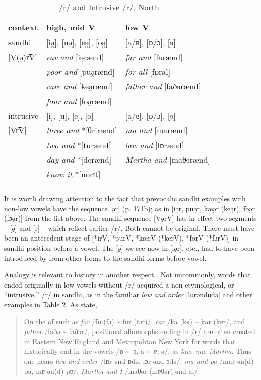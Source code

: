\documentclass[output=paper,
modfonts
]{LSP/langsci}
\begin{document}
\begin{table}[ht]
\centering\caption{ /r/ and Intrusive /r/, North}
\begin{tabular}{lll}
\lsptoprule
context 		  & 		high, mid V 		& low V\\
\midrule
sandhi 	  	  &  {[}iə̯{]}, {[}uə̯{]}, {[}eə̯{]}, {[}oə̯{]}	&	[a/ɐ], [ɒ/ɔ], [ɘ]\\
{[}V(ə̯)r͡V{]} & \emph{ear and} {[}iə̯rænd{]}		&	\emph{far and} {[}farænd{]}\\
			  & \emph{poor and} {[}puə̯rænd{]}		&	\emph{for all} {[}fɒral{]} \\
			  & \emph{care and} {[}keə̯rænd{]}		&	\emph{father and} {[}faðɘrænd{]}\\
			  & \emph{four and} {[}foə̯rænd{]}	 	& 	\\
intrusive		  & {[}i{]}, {[}u{]}, {[}e{]}, {[}o{]}			&	[a/ɐ], [ɒ/ɔ], [ɘ] \\
{[}Vr͡V{]}	  & \emph{three and} *{[}θrirænd{]}		&	\emph{ma and} {[}marænd{]} \\
			  & \emph{two and} *{[}turænd{]}		&	\emph{law and} [lɒr\underline{ænd}] \\
			  & \emph{day and} *{[}derænd{]}		&	\emph{Martha and} {[}maθɘrænd{]} \\
			  & \emph{know it} *{[}norɪt{]}			&	\\
\lspbottomrule
\end{tabular}
\end{table}

\largerpage
It is worth drawing attention to the fact that prevocalic sandhi
examples with non-low vowels have the sequence {[}ə̯r{]} (p. 171b); as in
{[}iə̯r, puə̯r, kæə̯r (keə̯r), foə̯r (fɔə̯r){]} from the list above. The
sandhi sequence {[}Və̯rV{]} has in effect two segments -- {[}ə̯{]} and
{[}r{]} -- which reflect earlier /r/. Both cannot be original. There must
have been an antecedent stage of {[}*irV, *purV, *kærV (*kerV), *forV
(*fɔrV){]} in sandhi position before a vowel. The {[}ə̯{]} we see now in
{[}iə̯r{]}, etc., had to have been introduced by  from other forms
to the sandhi forms before vowel.

  
Analogy is relevant to history in another respect \citep{SOS}. Not
uncommonly, words that ended originally in low vowels without /r/
acquired a non-etymological, or ``intrusive,'' /r/ in sandhi, as in the
familiar \emph{law and order} {[}lɒrəndɒdə{]} and other examples in
Table 2. As \citet[172a]{KUR} state,

\begin{quote}
On the  of such  as \emph{for} /fɒ (fɔ) \textasciitilde{}
fɒr (fɔr)/, \emph{car} /ka (kɐ) \textasciitilde{} kar (kɐr/, and
\emph{father} /faðə \textasciitilde{} faðər/, positional allomorphs
ending in /r/ are often created in Eastern New England and Metropolitan
New York for words that historically end in the vowels /ɒ \textasciitilde\ ɔ, a \textasciitilde\ ɐ, ə/, as \emph{law},
\emph{ma}, \emph{Martha}. Thus one hears \emph{law and order} /lɒr ənd
ɒdə, lɔr ənd ɔdə/, \emph{ma and pa} /mar ən(d) pa, mɐ ən(d) pɐ/,
\emph{Martha and I} /maθər (mɐθər) ənd ai/.
\end{quote}
\end{document}
